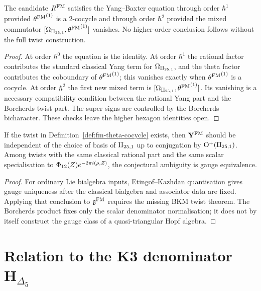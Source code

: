 \begin{proposition}
\label{ver:fm-path-iii}
The candidate $R^{\mathrm{FM}}$ satisfies the Yang--Baxter equation through order
$\hbar^1$ provided ${\theta^{\mathrm{FM}}}^{(1)}$ is a $2$-cocycle and through order
$\hbar^2$ provided the mixed commutator
$[\Omega_{\mathrm{II}_{25,1}},{\theta^{\mathrm{FM}}}^{(1)}]$ vanishes. No higher-order conclusion follows
without the full twist construction.
\end{proposition}

\begin{proof}
At order $\hbar^0$ the equation is the identity. At order $\hbar^1$ the
rational factor contributes the standard classical Yang term for
$\Omega_{\mathrm{II}_{25,1}}$, and the theta factor contributes the coboundary of
${\theta^{\mathrm{FM}}}^{(1)}$; this vanishes exactly when ${\theta^{\mathrm{FM}}}^{(1)}$ is a cocycle. At
order $\hbar^2$ the first new mixed term is
$[\Omega_{\mathrm{II}_{25,1}},{\theta^{\mathrm{FM}}}^{(1)}]$. Its vanishing is a necessary compatibility
condition between the rational Yang part and the Borcherds twist part.
The super signs are controlled by the Borcherds bicharacter. These
checks leave the higher hexagon identities open.
\end{proof}

\begin{conjecture}
\label{cor:fm-rtt-canonical}
\ClaimStatusConjectured
{}
If the twist in Definition~\ref{def:fm-theta-cocycle} exists, then
$\mathbf{Y}^{\mathrm{FM}}$ should be independent of the choice of basis of $\mathrm{II}_{25,1}$ up to
conjugation by $\mathrm{O}^+(\mathrm{II}_{25,1})$. Among twists with the same
classical rational part and the same scalar specialisation to
$\Phi_{12}(Z)e^{-2\pi i(\rho,Z)}$, the conjectural ambiguity is gauge
equivalence.
\end{conjecture}

\begin{proof}
For ordinary Lie bialgebra inputs, Etingof--Kazhdan quantisation gives
gauge uniqueness after the classical bialgebra and associator data are
fixed. Applying that conclusion to $\mathfrak{g}^{\mathrm{FM}}$ requires the missing BKM twist
theorem. The Borcherds product fixes only the scalar denominator
normalisation; it does not by itself construct the gauge class of a
quasi-triangular Hopf algebra.
\end{proof}

\section{Relation to the K3 denominator \texorpdfstring{$\mathbf{H}_{\Delta_5}$}{H-Delta-5}}
\label{sec:fm-to-k3}

